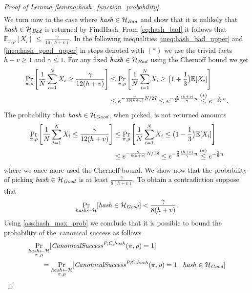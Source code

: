 \begin{proof}[Proof of Lemma \ref{lemma:hash_function_probability}]
\begin{align*}
\end{align*}
We turn now to the case where $\operatorname{\mathit{hash}} \in \mathcal{H}_{\operatorname{\mathit{Bad}}}$ and show that it is unlikely that $\operatorname{\mathit{hash}} \in \mathcal{H}_{\operatorname{\mathit{Bad}}}$
is returned by FindHash.
From \eqref{eq:hash_bad} it follows that $\mathbb{E}_{{\pi}, \rho}[X_i]~\leq~\frac{\gamma}{16(h+v)}$.
In the following inequalities \eqref{ineq:hash_bad_upper} and \eqref{ineq:hash_good_upper} in steps denoted
with $(*)$ we use the trivial facts $h + v \geq 1$ and $\gamma \leq 1$.
For any fixed $\operatorname{\mathit{hash}} \in \mathcal{H}_{\operatorname{\mathit{Bad}}}$ using the Chernoff bound we get
\begin{align}
  \label{ineq:hash_bad_upper}
  \underset{\pi,\rho}{\Pr} \left[\frac{1}{N} \sum_{i=1}^{N} X_i \geq \frac{\gamma}{12(h+v)} \right]
  &\leq \underset{\pi, \rho}{\Pr}\left[\frac{1}{N} \sum_{i=1}^{N} X_i \geq \bigl(1 + \frac{1}{3}\bigr) \mathbb{E}[X_i]\right] \notag\\
  &\leq e^{-{\frac{\gamma}{16(h+v)}} N / 27} \leq e^{-\frac{2}{27}\frac{(h+v)}{\gamma}n} \stackrel{(*)}{\leq} e^{-\frac{2}{27}n}.
\end{align}
The probability that $\operatorname{\mathit{hash}} \in \mathcal{H}_{\operatorname{\mathit{Good}}}$, when picked, is not returned amounts
\begin{align}
  \label{ineq:hash_good_upper}
  \underset{\pi, \rho}{\Pr}\left[\frac{1}{N} \sum_{i=1}^{N} X_i \leq \frac{\gamma}{12(h+v)}\right]
  &\leq \underset{\pi, \rho}{\Pr}\left[\frac{1}{N} \sum_{i=1}^{N} X_i \leq \bigl(1 - \frac{1}{3}\bigr)\mathbb{E}[X_i]\right] \notag\\
  &\leq e^{-{\frac{\gamma}{8(h+v)}} N / 18} \leq e^{-\frac{2}{9} \frac{(h+v)}{\gamma}n} \stackrel{(*)}{\leq} e^{-\frac{2}{9}n}
\end{align}
where we once more used the Chernoff bound.
We show now that the probability of picking $\operatorname{\mathit{hash}} \in \mathcal{H}_{\mathit{Good}}$ is at least $\frac{\gamma}{8(h+v)}$.
To obtain a contradiction suppose that
\begin{align}
  \label{ass:hash_max_prob}
\underset{\operatorname{\mathit{hash}} \leftarrow \mathcal{H}}{\Pr}[\operatorname{\mathit{hash}} \in \mathcal{H}_{\mathit{Good}}] < \frac{\gamma}{8(h+v)}.
\end{align}
Using \eqref{ass:hash_max_prob} we conclude that it is possible to bound the probability of the~canonical success as follows
\begin{align*}
  &\underset{\substack{\hash \leftarrow \cH \\ \pi, \rho}}{\Pr}[\CanonicalSuccess^{P,C,\hash}(\pi, \rho) = 1] \\
  &\IndI = \underset{\substack{ \hash \leftarrow \cH \\ \pi, \rho}}{\Pr}[\CanonicalSuccess^{P,C,\hash}(\pi, \rho) = 1 \mid \hash \in \cH_{\mathit{Good}}]

\end{align*}
\end{proof}
